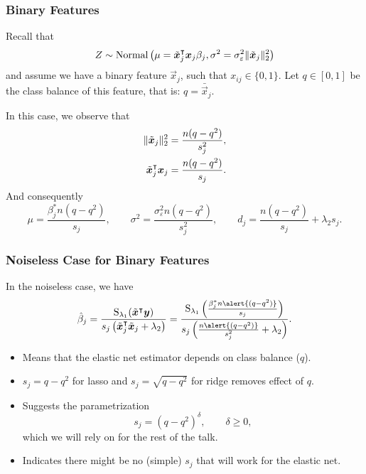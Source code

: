 \documentclass[aspectratio=1610,onlytextwidth]{beamer}
\begin{document}
\begin{frame}[c]
  \frametitle{Binary Features}
  Recall that
  \[
    Z \sim \operatorname{Normal}\left(\mu = \tilde{\boldsymbol{x}}_j^\intercal\boldsymbol{x}_j \beta_j, \sigma^2 =  \sigma_\varepsilon^2 \lVert \tilde{\boldsymbol{x}}_j\rVert_2^2 \right)
  \]
  and assume we have a binary feature \(\vec{x}_j\), such that \(x_{ij} \in \{0, 1\}\). Let
  \(q \in [0, 1]\) be the class balance of this feature, that is: \(q = \bar{\vec{x}}_j\).

  \bigskip

  In this case, we observe that
  \[
    \begin{aligned}
      \lVert \tilde{\bm{x}}_j\rVert_2^2 & = \frac{n(q-q^2)}{s^2_j}, \\
      \tilde{\boldsymbol{x}}_j^\intercal \boldsymbol{x}_j    & = \frac{n(q - q^2)}{s_j}.
    \end{aligned}
  \]
  \pause%
  And consequently
  \[
    \mu = \frac{\beta^*_j n(q - q^2)}{s_j}, \qquad \sigma^2 = \frac{\sigma_\varepsilon^2n(q - q^2)}{s^2_j}, \qquad d_j = \frac{n(q -q^2)}{s_j}  + \lambda_2 s_j.
  \]
\end{frame}

\begin{frame}[c]
  \frametitle{Noiseless Case for Binary Features}

  In the noiseless case, we have
  \[
    \hat{\beta}_j = \frac{\st_{\lambda_1}(\tilde{\vec{x}}^\intercal \vec{y})}{s_j\left(\tilde{\vec{x}}_j^\intercal \tilde{\vec{x}}_j + \lambda_2\right)}
    =
    \frac{\operatorname{S}_{\lambda_1}\left(\frac{\beta_j^* n \alert{(q - q^2)}}{s_j}\right)}{s_j\left(\frac{n\alert{(q - q^2)}}{s_j^2} + \lambda_2\right)}.
  \]
  \pause
  \begin{itemize}[<+->]
    \item Means that the elastic net estimator depends on class balance (\(q\)).
    \item \(s_j = q - q^2\) for lasso and \(s_j = \sqrt{q-q^2}\) for ridge removes effect of \(q\).
    \item Suggests the parametrization
          \[
            s_j = (q - q^2)^\delta, \qquad \delta \geq 0,
          \]
          which we will rely on for the rest of the talk.
    \item Indicates there might be no (simple) \(s_j\) that will work for the elastic net.
  \end{itemize}
\end{frame}
\end{document}
